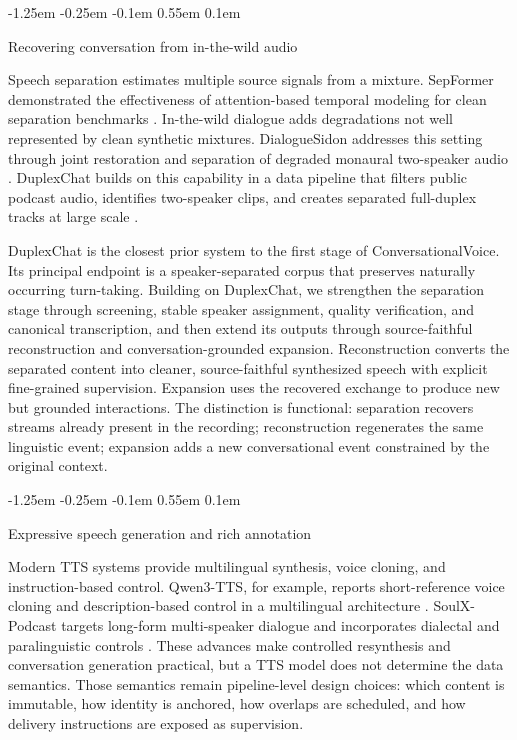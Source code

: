 \documentclass[10pt,twocolumn]{article}
\makeatletter
\renewcommand\subsection{%
  \@startsection{subsection}{2}{\z@}%
    {-1.25em \@plus -0.25em \@minus -0.1em}%
    {0.55em \@plus 0.1em}%
    {\normalfont\fontsize{10.5}{12.5}\selectfont\bfseries\raggedright
     \hyphenpenalty=10000\exhyphenpenalty=10000}}
\newcommand{\system}{\textsf{ConversationalVoice}\xspace}
\makeatother
\begin{document}
\subsection{Recovering conversation from in-the-wild audio}

Speech separation estimates multiple source signals from a mixture. SepFormer demonstrated the effectiveness of attention-based temporal modeling for clean separation benchmarks \citep{subakan2021sepformer}. In-the-wild dialogue adds degradations not well represented by clean synthetic mixtures. DialogueSidon addresses this setting through joint restoration and separation of degraded monaural two-speaker audio \citep{nakata2026dialoguesidon}. DuplexChat builds on this capability in a data pipeline that filters public podcast audio, identifies two-speaker clips, and creates separated full-duplex tracks at large scale \citep{nakata2026duplexchat}.

DuplexChat is the closest prior system to the first stage of \system. Its principal endpoint is a speaker-separated corpus that preserves naturally occurring turn-taking. Building on DuplexChat, we strengthen the separation stage through screening, stable speaker assignment, quality verification, and canonical transcription, and then extend its outputs through source-faithful reconstruction and conversation-grounded expansion. Reconstruction converts the separated content into cleaner, source-faithful synthesized speech with explicit fine-grained supervision. Expansion uses the recovered exchange to produce new but grounded interactions. The distinction is functional: separation recovers streams already present in the recording; reconstruction regenerates the same linguistic event; expansion adds a new conversational event constrained by the original context.

\subsection{Expressive speech generation and rich annotation}

Modern TTS systems provide multilingual synthesis, voice cloning, and instruction-based control. Qwen3-TTS, for example, reports short-reference voice cloning and description-based control in a multilingual architecture \citep{hu2026qwen3tts}. SoulX-Podcast targets long-form multi-speaker dialogue and incorporates dialectal and paralinguistic controls \citep{xie2025soulx}. These advances make controlled resynthesis and conversation generation practical, but a TTS model does not determine the data semantics. Those semantics remain pipeline-level design choices: which content is immutable, how identity is anchored, how overlaps are scheduled, and how delivery instructions are exposed as supervision.
\end{document}
